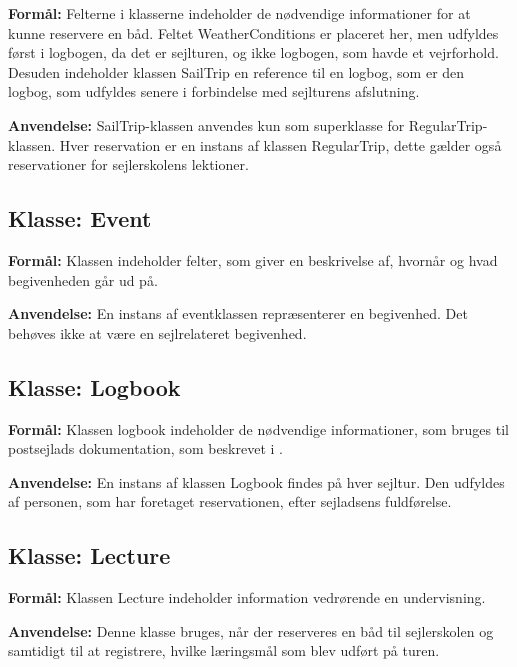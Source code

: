 \textbf{Formål:}
Felterne i klasserne indeholder de nødvendige informationer for at kunne reservere en båd.
Feltet WeatherConditions er placeret her, men udfyldes først i logbogen, da det er sejlturen, og ikke logbogen, som havde et vejrforhold.
Desuden indeholder klassen SailTrip en reference til en logbog, som er den logbog, som udfyldes senere i forbindelse med sejlturens afslutning.

\textbf{Anvendelse:}
SailTrip-klassen anvendes kun som superklasse for RegularTrip-klassen. 
Hver reservation er en instans af klassen RegularTrip, dette gælder også reservationer for sejlerskolens lektioner.

\subsection*{Klasse: Event}

\textbf{Formål:}
Klassen indeholder felter, som giver en beskrivelse af, hvornår og hvad begivenheden går ud på. 

\textbf{Anvendelse:}
En instans af eventklassen repræsenterer en begivenhed. 
Det behøves ikke at være en sejlrelateret begivenhed.

\subsection*{Klasse: Logbook}

\textbf{Formål:}
Klassen logbook indeholder de nødvendige informationer, som bruges til postsejlads dokumentation, som beskrevet i .

\textbf{Anvendelse:}
En instans af klassen Logbook findes på hver sejltur. 
Den udfyldes af personen, som har foretaget reservationen, efter sejladsens fuldførelse. 

\subsection*{Klasse: Lecture}

\textbf{Formål:}
Klassen Lecture indeholder information vedrørende en undervisning. 

\textbf{Anvendelse:}
Denne klasse bruges, når der reserveres en båd til sejlerskolen og samtidigt til at registrere, hvilke læringsmål som blev udført på turen. 
